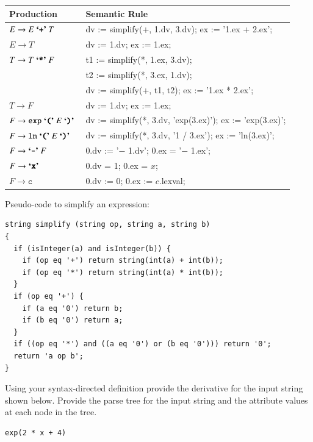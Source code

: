 \documentclass[12pt]{article}
\newcommand{\ident}[1]{\texttt{#1}}
\newcommand{\termchar}[1]{\mbox{\textbf{`\texttt{#1}'}\ }}
\begin{document}
\begin{exe}
\begin{xlist}
{\begin{soln}
 \begin{center}
 \begin{tabular}{ll}
 \hline
 Production & Semantic Rule \\
 \hline
  $E \rightarrow E\ \termchar{+} T$ & 
    dv := simplify(+, 1.dv, 3.dv); ex := '1.ex + 2.ex'; \\
  $E \rightarrow T$ &
    dv := 1.dv; ex := 1.ex; \\
  $T \rightarrow T\ \termchar{*} F$ & 
    t1 := simplify(*, 1.ex, 3.dv); \\
  & t2 := simplify(*, 3.ex, 1.dv); \\
  & dv := simplify(+, t1, t2); ex := '1.ex * 2.ex'; \\
  $T \rightarrow F$ & 
    dv := 1.dv; ex := 1.ex; \\
  $F \rightarrow \ident{exp}\ \termchar{(} E\ \termchar{)}$ & 
    dv := simplify(*, 3.dv, 'exp(3.ex)'); ex := 'exp(3.ex)'; \\
  $F \rightarrow \ident{ln}\ \termchar{(} E\ \termchar{)}$ & 
    dv := simplify(*, 3.dv, '1 / 3.ex'); ex := 'ln(3.ex)'; \\
  $F \rightarrow \termchar{-} F$ & 0.dv := '$-$ 1.dv'; 0.ex = '$-$ 1.ex'; \\
  $F \rightarrow \termchar{x}$ & 0.dv = 1; 0.ex = $x$; \\
  $F \rightarrow \ident{c}$ & 0.dv := 0; 0.ex := $c$.lexval; \\
 \hline
 \end{tabular}
 \end{center}

\noindent Pseudo-code to simplify an expression:

{\footnotesize\begin{verbatim}
string simplify (string op, string a, string b)
{
  if (isInteger(a) and isInteger(b)) {
    if (op eq '+') return string(int(a) + int(b));
    if (op eq '*') return string(int(a) * int(b));
  }
  if (op eq '+') {
    if (a eq '0') return b;
    if (b eq '0') return a;
  }
  if ((op eq '*') and ((a eq '0') or (b eq '0'))) return '0';
  return 'a op b';
}
\end{verbatim}
}

\end{soln}
}


{\ex Using your syntax-directed definition provide the derivative for 
the input string shown below. Provide the parse tree for the input string and the 
attribute values at each node in the tree.
\begin{verbatim}
exp(2 * x + 4)
\end{verbatim}

}
\end{xlist}
\end{exe}
\end{document}
